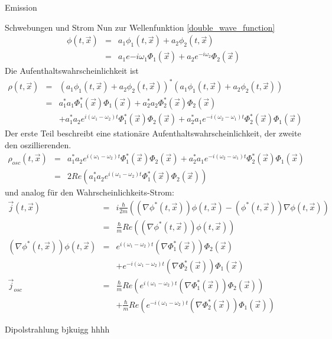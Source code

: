 \begin{chapter}{\titlestr}
\begin{section}{Emission}
\begin{subsection}{Schwebungen und Strom}
Nun zur Wellenfunktion \ref{double_wave_function}
\begin{eqnarray*}
\phi(t,\vec{x}) &=& a_1\phi_1(t,\vec{x})+a_2\phi_2(t,\vec{x})\\
&=& a_1e {-i\omega_1}\Phi_1(\vec{x})+a_2e^{-i\omega_2}\Phi_2(\vec{x})
\end{eqnarray*}
Die Aufenthaltswahrscheinlichkeit ist
\begin{eqnarray*}
\rho(t,\vec{x}) &=& \left(a_1\phi_1(t,\vec{x})+a_2\phi_2(t,\vec{x})\right)^*\left(a_1\phi_1(t,\vec{x})+a_2\phi_2(t,\vec{x})\right)\\
&=&a_1^*a_1\Phi^*_1(\vec{x})\Phi_1(\vec{x})+a_2^*a_2\Phi^*_2(\vec{x})\Phi_2(\vec{x})\\
&&+a_1^*a_2e^{i(\omega_1-\omega_2)t}\Phi^*_1(\vec{x})\Phi_2(\vec{x})+a_2^*a_1e^{-i(\omega_2-\omega_1)t}\Phi^*_2(\vec{x})\Phi_1(\vec{x})
\end{eqnarray*}
Der erste Teil beschreibt eine stationäre Aufenthaltswahrscheinlichkeit, der zweite den oszillierenden.
\begin{eqnarray*}
\rho_{osc}(t,\vec{x}) &=& a_1^*a_2e^{i(\omega_1-\omega_2)t}\Phi^*_1(\vec{x})\Phi_2(\vec{x})+a_2^*a_1e^{-i(\omega_2-\omega_1)t}\Phi^*_2(\vec{x})\Phi_1(\vec{x})\\
&=& 2Re\left(a_1^*a_2e^{i(\omega_1-\omega_2)t}\Phi^*_1(\vec{x})\Phi_2(\vec{x})\right)
\end{eqnarray*}
und analog für den Wahrscheinlichkeits-Strom:
\begin{eqnarray*}
\vec{j}(t,\vec{x}) &=& i\frac{\hbar}{2m}\left(\left(\nabla\phi^*(t,\vec{x})\right)\phi(t,\vec{x})-\left(\phi^*(t,\vec{x})\right)\nabla\phi(t,\vec{x})\right)\\
&=& \frac{\hbar}{m}Re\left(\left(\nabla\phi^*(t,\vec{x})\right)\phi(t,\vec{x})\right)\\
\left(\nabla\phi^*(t,\vec{x})\right)\phi(t,\vec{x}) &=& e^{i(\omega_1-\omega_2)t}\left(\nabla\Phi_1^*(\vec{x})\right)\Phi_2(\vec{x})\\
&&+e^{-i(\omega_1-\omega_2)t}\left(\nabla\Phi_2^*(\vec{x})\right)\Phi_1(\vec{x})\\
\vec{j}_{osc} &=& \frac{\hbar}{m}Re\left(e^{i(\omega_1-\omega_2)t}\left(\nabla\Phi_1^*(\vec{x})\right)\Phi_2(\vec{x})\right)\\
&&+\frac{\hbar}{m}Re\left(e^{-i(\omega_1-\omega_2)t}\left(\nabla\Phi_2^*(\vec{x})\right)\Phi_1(\vec{x})\right)
\end{eqnarray*}
\end{subsection}

\begin{subsection}{Dipolstrahlung}
bjkuigg
hhhh

\end{subsection}
\end{section}

\ifx\makebook\undefined
	
\else
	\end{chapter}
\fi
